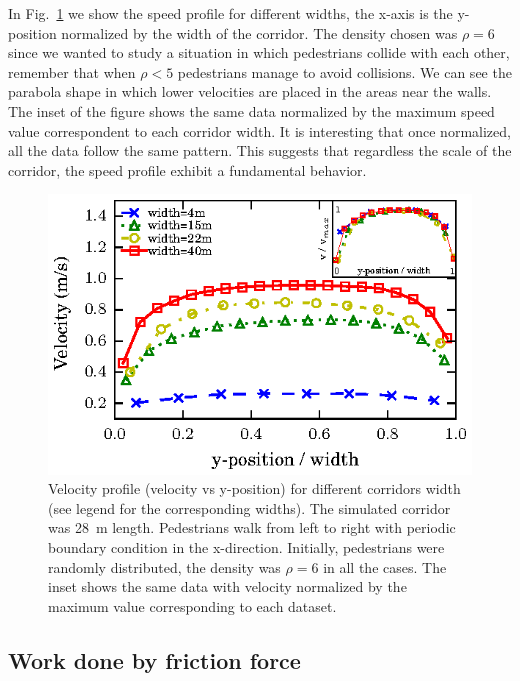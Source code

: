 In Fig.~\ref{speed-profile-multi_width} we show the speed profile for different widths, the x-axis is the y-position normalized by the width of the corridor. The density chosen was $\rho = 6$ since we wanted to study a situation in which pedestrians collide with each other, remember that when $\rho<5$ pedestrians manage to avoid collisions. We can see the parabola shape in which lower velocities are placed in the areas near the walls. The inset of the figure shows the same data normalized by the maximum speed value correspondent to each corridor width. It is interesting that once normalized, all the data follow the same pattern. This suggests that regardless the scale of the corridor, the speed profile exhibit a fundamental behavior. 

\begin{figure}[htbp!]
\includegraphics[width=\columnwidth]
{plots/v(y)_multi_width.eps}
\caption{\label{speed-profile-multi_width} Velocity profile (velocity vs y-position) for different corridors width (see legend for the corresponding widths). The simulated corridor was 28~m length. Pedestrians walk from left to right with periodic boundary condition in the x-direction. Initially, pedestrians were randomly distributed, the density was $\rho = 6$ in all the cases. The inset shows the same data with velocity normalized by the maximum value corresponding to each dataset. }
\end{figure}


\subsection{Work done by friction force}


